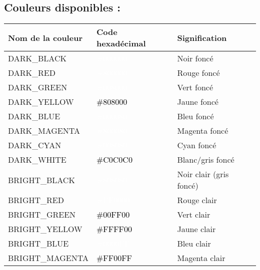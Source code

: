 \documentclass{article}
\begin{document}
\newpage
\subsection{Couleurs disponibles :}
\begin{table}[h!]
    \centering
    \renewcommand{\arraystretch}{1.5}
    \footnotesize
    \begin{tabular}{|>{\centering\arraybackslash}m{4cm}|>{\centering\arraybackslash}m{3cm}|>{\centering\arraybackslash}m{3cm}|}
        \hline
        \textbf{Nom de la couleur} & \textbf{Code hexadécimal} & \textbf{Signification} \\
        \hline
        DARK\_BLACK & \cellcolor[HTML]{000000}\textcolor{white}{\#000000} & Noir foncé \\
        \hline
        DARK\_RED & \cellcolor[HTML]{800000}\textcolor{white}{\#800000} & Rouge foncé \\
        \hline
        DARK\_GREEN & \cellcolor[HTML]{008000}\textcolor{white}{\#008000} & Vert foncé \\
        \hline
        DARK\_YELLOW & \cellcolor[HTML]{808000}\textcolor{black}{\#808000} & Jaune foncé \\
        \hline
        DARK\_BLUE & \cellcolor[HTML]{000080}\textcolor{white}{\#000080} & Bleu foncé \\
        \hline
        DARK\_MAGENTA & \cellcolor[HTML]{800080}\textcolor{white}{\#800080} & Magenta foncé \\
        \hline
        DARK\_CYAN & \cellcolor[HTML]{008080}\textcolor{white}{\#008080} & Cyan foncé \\
        \hline
        DARK\_WHITE & \cellcolor[HTML]{C0C0C0}\textcolor{black}{\#C0C0C0} & Blanc/gris foncé \\
        \hline
        BRIGHT\_BLACK & \cellcolor[HTML]{808080}\textcolor{white}{\#808080} & Noir clair (gris foncé) \\
        \hline
        BRIGHT\_RED & \cellcolor[HTML]{FF0000}\textcolor{white}{\#FF0000} & Rouge clair \\
        \hline
        BRIGHT\_GREEN & \cellcolor[HTML]{00FF00}\textcolor{black}{\#00FF00} & Vert clair \\
        \hline
        BRIGHT\_YELLOW & \cellcolor[HTML]{FFFF00}\textcolor{black}{\#FFFF00} & Jaune clair \\
        \hline
        BRIGHT\_BLUE & \cellcolor[HTML]{0000FF}\textcolor{white}{\#0000FF} & Bleu clair \\
        \hline
        BRIGHT\_MAGENTA & \cellcolor[HTML]{FF00FF}\textcolor{black}{\#FF00FF} & Magenta clair \\

\end{tabular}
\end{table}
\end{document}
